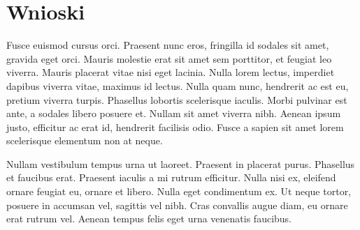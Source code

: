 \documentclass[polish,polish,a4paper]{article}
\begin{document}
\section{Wnioski}
Fusce euismod cursus orci. Praesent nunc eros, fringilla id sodales sit amet, gravida eget orci. Mauris molestie erat sit amet sem porttitor, et feugiat leo viverra. Mauris placerat vitae nisi eget lacinia. Nulla lorem lectus, imperdiet dapibus viverra vitae, maximus id lectus. Nulla quam nunc, hendrerit ac est eu, pretium viverra turpis. Phasellus lobortis scelerisque iaculis. Morbi pulvinar est ante, a sodales libero posuere et. Nullam sit amet viverra nibh. Aenean ipsum justo, efficitur ac erat id, hendrerit facilisis odio. Fusce a sapien sit amet lorem scelerisque elementum non at neque.

Nullam vestibulum tempus urna ut laoreet. Praesent in placerat purus. Phasellus et faucibus erat. Praesent iaculis a mi rutrum efficitur. Nulla nisi ex, eleifend ornare feugiat eu, ornare et libero. Nulla eget condimentum ex. Ut neque tortor, posuere in accumsan vel, sagittis vel nibh. Cras convallis augue diam, eu ornare erat rutrum vel. Aenean tempus felis eget urna venenatis faucibus.


\end{document}
